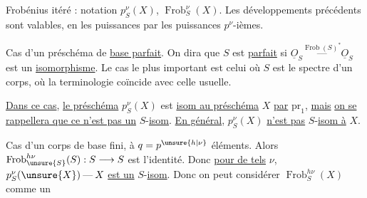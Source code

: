 Frobénius itéré : notation $p_S^\nu(X)$, $\operatorname{Frob}_S^\nu(X)$.
Les développements précédents sont valables, en  les
puissances  par les puissances $p^\nu$-ièmes.

Cas d'un préschéma de \uline{base parfait}.
On dira que $S$ est \uline{parfait} si 
$\underline O_S\mathbin{\overset{\operatorname{Frob}(S)^*}{\text{---}}}\underline O_S$
est un \uline{isomorphisme}.
Le cas le plus important est celui où $S$ est le spectre d'un corps, où
la terminologie coïncide avec celle usuelle.

\uline{Dans ce cas}, \uline{le préschéma} $p_S^\nu(X)$ est
\uline{isom au préschéma} $X$ \uline{par} $\mathrm{pr}_1$, \uline{mais}
\uline{on se rappellera que ce n'est pas un} $S$-\uline{isom}.
\uline{En général}, $p_S^\nu(X)$ \uline{n'est pas}
$S$-\uline{isom à} $X$.

Cas d'un corps de base fini, à $q=p^{\unsure{h|\nu}}$ éléments.
\inserted{$[\deleted{\unsure{\nu=h\nu}}\unsure{\nu\mapsto h\nu}]$}
Alors $\operatorname{Frob}_{\unsure{S}}^{h\nu}(S):S\longrightarrow S$
est l'identité. Donc \uline{pour de tels} $\nu$,
$p_S^\nu(\unsure{X})\mathbin{\text{---}}X$ \uline{est un} $S$-\uline{isom}.
Donc on peut considérer $\operatorname{Frob}_S^{h\nu}(X)$ comme un
